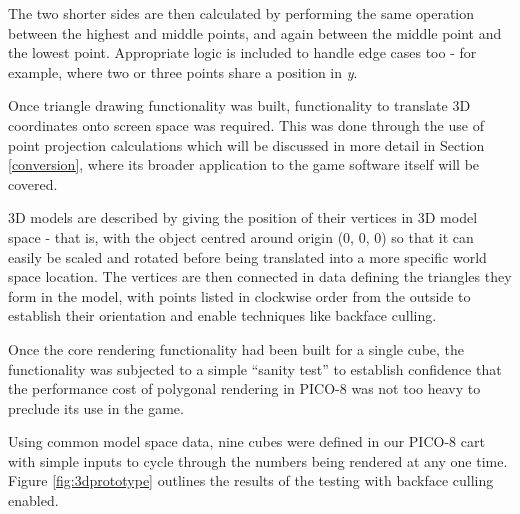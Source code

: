 \documentclass{article}
\begin{document}
The two shorter sides are then calculated by performing the same operation between the highest
and middle points, and again between the middle point and the lowest point. Appropriate logic is
included to handle edge cases too - for example, where two or three points share a position in
\textit{y}.


Once triangle drawing functionality was built, functionality to translate 3D coordinates onto
screen space was required. This was done through the use of point projection calculations which
will be discussed in more detail in Section \ref{conversion},
where its broader application to the game software itself will be covered.


3D models are described by giving the position of their vertices in 3D model space - that is,
with the object centred around origin (0, 0, 0) so that it can easily be scaled and rotated
before being translated into a more specific world space location. The vertices are then connected
in data defining the triangles they form in the model, with points listed in clockwise order from
the outside to establish their orientation and enable techniques like backface culling.





Once the core rendering functionality had been built for a single cube, the functionality
was subjected to a simple ``sanity test'' to establish confidence that the performance
cost of polygonal rendering in PICO-8 was not too heavy to preclude its use in the
game.

Using common model space data, nine cubes were defined in our PICO-8 cart with simple inputs
to cycle through the numbers being rendered at any one time. Figure \ref{fig:3dprototype}
outlines the results of the testing with backface culling enabled.
\end{document}
